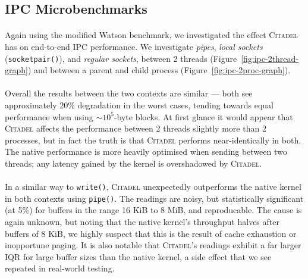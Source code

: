 \subsection{IPC Microbenchmarks}
\label{sec:ipc-microbenchmarks}

\paragraph{} Again using the modified Watson benchmark, we investigated the effect \textsc{Citadel} has on end-to-end IPC performance. We investigate \textit{pipes}, \textit{local sockets} (\texttt{socketpair()}), and \textit{regular sockets}, between 2 threads (Figure~\ref{fig:ipc-2thread-graph}) and between a parent and child process (Figure~\ref{fig:ipc-2proc-graph}).

\paragraph{} Overall the results between the two contexts are similar --- both see approximately 20\% degradation in the worst cases, tending towards equal performance when using $\sim 10^5$-byte blocks. At first glance it would appear that \textsc{Citadel} affects the performance between 2 threads slightly more than 2 processes, but in fact the truth is that \textsc{Citadel} performs near-identically in both. The native performance is more heavily optimised when sending between two threads; any latency gained by the kernel is overshadowed by \textsc{Citadel}.

\paragraph{} In a similar way to \texttt{write()}, \textsc{Citadel} unexpectedly outperforms the native kernel in both contexts using \texttt{pipe()}. The readings are noisy, but statistically significant (at 5\%) for buffers in the range 16 KiB to 8 MiB, and reproducable. The cause is again unknown, but noting that the native kernel's throughput halves after buffers of 8 KiB, we highly suspect that this is the result of cache exhaustion or inopportune paging. It is also notable that \textsc{Citadel}'s readings exhibit a far larger IQR for large buffer sizes than the native kernel, a side effect that we see repeated in real-world testing.

